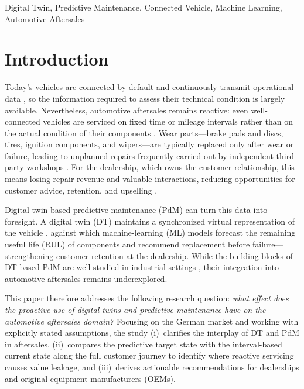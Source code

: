 \documentclass[conference,a4paper]{IEEEtran}
\begin{document}
\begin{IEEEkeywords}
Digital Twin, Predictive Maintenance, Connected Vehicle, Machine Learning, Automotive Aftersales
\end{IEEEkeywords}


\section{Introduction}

Today's vehicles are connected by default and continuously transmit operational
data \cite{lopes2025vehicledt,coppola2016connected}, so the information required
to assess their technical condition is largely available. Nevertheless, automotive aftersales remains reactive: even well-connected vehicles are serviced on fixed time or mileage
intervals rather than on the actual condition of their components \cite{national_transport_university_overview_2023}.
Wear parts---brake pads and discs, tires, ignition components, and wipers---are typically replaced only after wear or failure, leading to unplanned repairs frequently carried out by independent third-party workshops \cite{alexander_secret_2002}. For the
dealership, which owns the customer relationship, this means losing
repair revenue and valuable interactions, reducing opportunities for
customer advice, retention, and upselling \cite{challagalla_proactive_2009,sabbagha_impact_2016}.

Digital-twin-based predictive maintenance (PdM) can turn this data into
foresight. A digital twin (DT) maintains a synchronized virtual representation of
the vehicle \cite{grieves2014}, against which machine-learning (ML) models forecast
the remaining useful life (RUL) of components and recommend replacement before
failure---strengthening customer retention at the dealership. While the building blocks of DT-based PdM are well studied
in industrial settings \cite{wang2023review,abougrad2026xai},
their integration into automotive aftersales remains underexplored.

This paper therefore addresses the following research question: \emph{what effect does the proactive use of digital
twins and predictive maintenance have on the automotive aftersales domain?}
Focusing on the German market and working with explicitly stated assumptions,
the study (i)~clarifies the interplay of DT and PdM in aftersales, (ii)~compares the predictive target state with the interval-based current state along the full customer journey to identify where reactive servicing causes value leakage, and (iii)~derives actionable recommendations for dealerships and original equipment manufacturers (OEMs).
\end{document}
